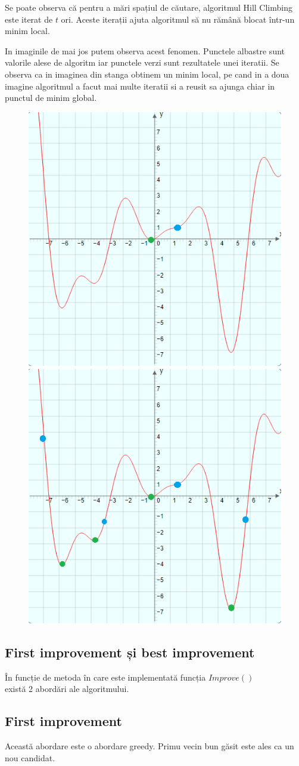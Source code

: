 \documentclass{article}
\begin{document}
Se poate observa că pentru a mări spațiul de căutare, algoritmul Hill Climbing este iterat de $t$ ori. Aceste iterații ajuta algoritmul să nu rămână blocat 
într-un minim local. 

In imaginile de mai jos putem observa acest fenomen. Punctele albastre sunt valorile alese de algoritm iar punctele verzi sunt rezultatele unei iteratii. Se observa ca in imaginea din stanga obtinem un minim local, pe cand in a doua imagine algoritmul a facut mai multe iteratii si a reusit sa ajunga chiar in punctul de minim global.

\begin{figure}[h!]
\begin{multicols}{2}
    \includegraphics[width=.4\textwidth]{2a}
    \includegraphics[width=.4\textwidth]{2b}
    \end{multicols}
\end{figure}

\subsection{First improvement și best improvement}
În funcție de metoda în care este implementată funcția $Improve()$\\ există 2 abordări ale algoritmului.
\subsection*{First improvement}
Această abordare este o abordare greedy. Primu vecin bun găsit este ales ca un nou candidat.
\end{document}
